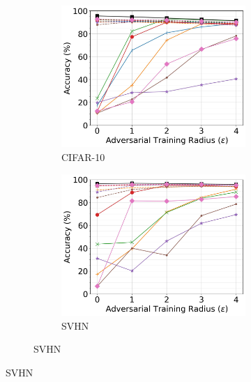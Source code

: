 \documentclass[conference]{IEEEtran}
\theoremstyle{definition}
\theoremstyle{remark}
\theoremstyle{proposition}
\begin{document}
\begin{figure}[p!]
    \begin{subfigure}{1.0\textwidth}
	\begin{subfigure}{.3\textwidth}
		\centering
		\includegraphics[width=1.0\textwidth]{WRN-34_AT_CIFAR-10.jpg}
		\caption*{CIFAR-10}
		\label{fig:at_cifar10:wrn34}
	\end{subfigure}\hspace*{0.75em}
	\begin{subfigure}{.3\textwidth}
		\centering
		\includegraphics[width=1.0\textwidth]{WRN-34_AT_SVHN.jpg}
		\caption*{SVHN}
		\label{fig:at_svhn:wrn34}
	\end{subfigure}\hspace*{0.75em}

\end{subfigure}
\end{figure}
\end{document}
